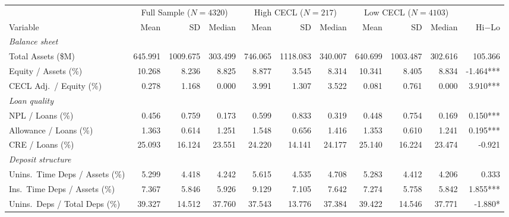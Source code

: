 \begingroup
\centering
\begin{tabular}{lrrr rrr rrr r}
  \tabularnewline \midrule \midrule
  & \multicolumn{3}{c}{Full Sample ($N=4320$)} & \multicolumn{3}{c}{High CECL ($N=217$)} & \multicolumn{3}{c}{Low CECL ($N=4103$)} & \\
  \cmidrule(lr){2-4}\cmidrule(lr){5-7}\cmidrule(lr){8-10}
  Variable & Mean & SD & Median & Mean & SD & Median & Mean & SD & Median & Hi$-$Lo \\
  \midrule
  \emph{Balance sheet} & & & & & & & & & & \\
  \hspace{1em}Total Assets (\$M) & 645.991 & 1009.675 & 303.499 & 746.065 & 1118.083 & 340.007 & 640.699 & 1003.487 & 302.616 & 105.366 \\
  \hspace{1em}Equity / Assets (\%) & 10.268 & 8.236 & 8.825 & 8.877 & 3.545 & 8.314 & 10.341 & 8.405 & 8.834 & -1.464*** \\
  \hspace{1em}CECL Adj.\ / Equity (\%) & 0.278 & 1.168 & 0.000 & 3.991 & 1.307 & 3.522 & 0.081 & 0.761 & 0.000 & 3.910*** \\
  \midrule
  \emph{Loan quality} & & & & & & & & & & \\
  \hspace{1em}NPL / Loans (\%) & 0.456 & 0.759 & 0.173 & 0.599 & 0.833 & 0.319 & 0.448 & 0.754 & 0.169 & 0.150*** \\
  \hspace{1em}Allowance / Loans (\%) & 1.363 & 0.614 & 1.251 & 1.548 & 0.656 & 1.416 & 1.353 & 0.610 & 1.241 & 0.195*** \\
  \hspace{1em}CRE / Loans (\%) & 25.093 & 16.124 & 23.551 & 24.220 & 14.141 & 24.177 & 25.140 & 16.224 & 23.474 & -0.921 \\
  \midrule
  \emph{Deposit structure} & & & & & & & & & & \\
  \hspace{1em}Unins.\ Time Deps / Assets (\%) & 5.299 & 4.418 & 4.242 & 5.615 & 4.535 & 4.708 & 5.283 & 4.412 & 4.206 & 0.333 \\
  \hspace{1em}Ins.\ Time Deps / Assets (\%) & 7.367 & 5.846 & 5.926 & 9.129 & 7.105 & 7.642 & 7.274 & 5.758 & 5.842 & 1.855*** \\
  \hspace{1em}Unins.\ Deps / Total Deps (\%) & 39.327 & 14.512 & 37.760 & 37.543 & 13.776 & 37.384 & 39.422 & 14.546 & 37.771 & -1.880* \\

\end{tabular}
